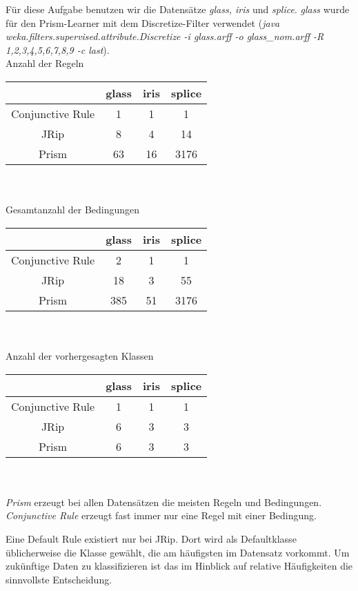 
F\"ur diese Aufgabe benutzen wir die Datens\"atze \emph{glass, iris} und \emph{splice}.
\emph{glass} wurde f\"ur den Prism-Learner mit dem Discretize-Filter verwendet (\emph{java weka.filters.supervised.attribute.Discretize -i glass.arff -o glass\_nom.arff -R 1,2,3,4,5,6,7,8,9 -c last}).\\

Anzahl der Regeln \\
\begin{tabular}{c|c|c|c}
	             & glass & iris & splice \\ \hline
Conjunctive Rule &   1   &  1   &   1    \\ \hline
JRip             &   8   &  4   &   14   \\ \hline
Prism	         &   63  &  16   &  3176    \\
\end{tabular}\\ \\

Gesamtanzahl der Bedingungen \\
\begin{tabular}{c|c|c|c}
	             & glass & iris & splice \\ \hline
Conjunctive Rule &   2   &  1   &   1    \\ \hline
JRip             &  18   &  3   &   55   \\ \hline
Prism	         &  385  & 51   &   3176   \\
\end{tabular}\\ \\

Anzahl der vorhergesagten Klassen \\
\begin{tabular}{c|c|c|c}
	             & glass & iris & splice \\ \hline
Conjunctive Rule &   1   &  1   &   1    \\ \hline
JRip             &   6   &  3   &   3    \\ \hline
Prism	         &   6   &  3   &   3    \\
\end{tabular}\\ \\

\emph{Prism} erzeugt bei allen Datens\"atzen die meisten Regeln und Bedingungen. \emph{Conjunctive Rule} erzeugt fast immer nur eine Regel mit einer Bedingung.

Eine Default Rule existiert nur bei JRip. Dort wird als Defaultklasse \"ublicherweise die Klasse gew\"ahlt, die am h\"aufigsten im Datensatz vorkommt. Um zukünftige Daten zu klassifizieren ist das im Hinblick auf relative Häufigkeiten die sinnvollste Entscheidung.

